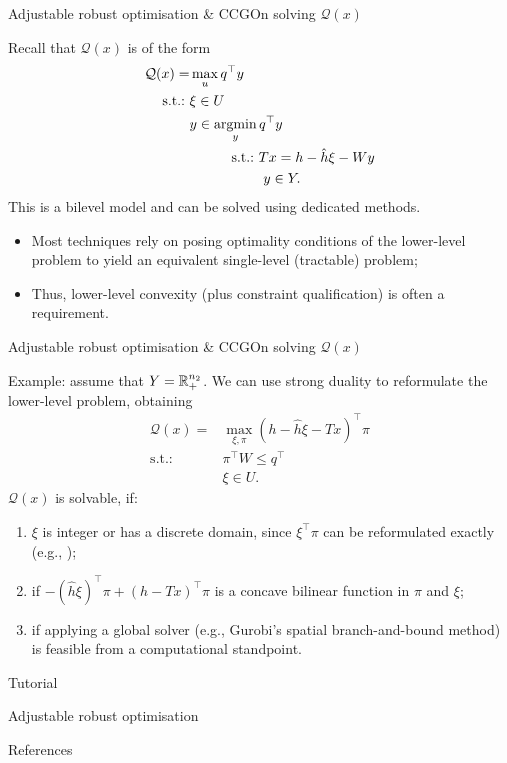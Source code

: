 \begin{frame}{Adjustable robust optimisation \& CCG}{On solving $\mathcal{Q}(x)$}

	Recall that $\mathcal{Q}(x)$  is of the form
	\begin{align*}
	\mathcal{Q}(x)	 = &\max_u q^\top y    \\
	   \st &\xi \in U  \\ 	 
		   &y \in \argmin_y q^\top y \\
	       &\qquad \quad \text{s.t.:~} Tx = h - \hat{h} \xi - Wy \\
	       &\qquad \quad \phantom{~\text{s.t.:~}} y \in Y. 
	\end{align*}
	\pause
	This is a \alert{bilevel model} and can be solved using dedicated methods.
	\vspace{-6pt}
	\begin{itemize}
		\item Most techniques rely on \alert{posing optimality conditions} of the lower-level problem to yield an \alert{equivalent single-level} (tractable) problem;
		\item Thus, \alert{lower-level convexity} (plus constraint qualification) is often a requirement.
	\end{itemize}

\end{frame}


\begin{frame}{Adjustable robust optimisation \& CCG}{On solving $\mathcal{Q}(x)$}

	Example: assume that $Y = \mathbb R_+^{n_2}$. We can use strong duality to reformulate the lower-level problem, obtaining
	\begin{align*}
		\mathcal{Q}(x) = &\max_{\xi,\pi} (h - \hat{h} \xi - Tx)^\top \pi \\
		   \text{s.t.:~} & \pi^\top W \leq q^\top \\
		   	   & \xi \in U.	 
	\end{align*}
	\pause
	$\mathcal{Q}(x)$ is solvable, if:
	\vspace{-6pt} 
	\begin{enumerate}
		\item $\xi$ is integer or has a discrete domain, since $\xi^\top \pi$ can be reformulated exactly (e.g., {\small \cite{rintamaki2023achieving}});
		\item if $-(\hat{h}\xi)^\top \pi + (h - Tx)^\top \pi$ is a \alert{concave bilinear} function in $\pi$ and $\xi$;
		\item if applying a \alert{global solver} (e.g., Gurobi's spatial branch-and-bound method) is feasible from a computational standpoint.	
	\end{enumerate}

	
\end{frame}

\begin{frame}{Tutorial}

\centering
\bf
\large

Adjustable robust optimisation
	
\end{frame}


\begin{frame}[allowframebreaks]{References}
	
	
\end{frame}

